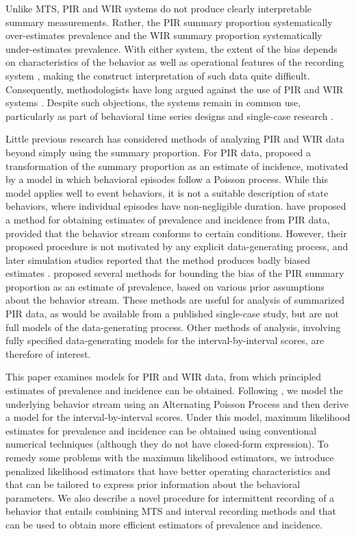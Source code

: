\documentclass[man, noextraspace, floatsintext]{apa6}\usepackage[]{graphicx}\usepackage[]{color}
\begin{document}
Unlike MTS, PIR and WIR systems do not produce clearly interpretable summary measurements. 
Rather, the PIR summary proportion systematically over-estimates prevalence and the WIR summary proportion systematically under-estimates prevalence. 
With either system, the extent of the bias depends on characteristics of the behavior as well as operational features of the recording system \citep{Kraemer1979one, Rogosa1991statistical}, making the construct interpretation of such data quite difficult. 
Consequently, methodologists have long argued against the use of PIR and WIR systems \citep{Altmann1974observational, Mann1991time, Lane2014using}.
Despite such objections, the systems remain in common use, particularly as part of behavioral time series designs and single-case research \citep{Rapp2007interval, Mudford2009continuous, Lane2014using}. 

Little previous research has considered methods of analyzing PIR and WIR data beyond simply using the summary proportion.
For PIR data, \citet{Altmann1970estimating} proposed a transformation of the summary proportion as an estimate of incidence, motivated by a model in which behavioral episodes follow a Poisson process. While this model applies well to event behaviors, it is not a suitable description of state behaviors, where individual episodes have non-negligible duration. 
\citet{Suen1986post, Suen1989analyzing} have proposed a method for obtaining estimates of prevalence and incidence from PIR data, provided that the behavior stream conforms to certain conditions. 
However, their proposed procedure is not motivated by any explicit data-generating process, and later simulation studies reported that the method produces badly biased estimates \citep[sec. 5.2]{Rogosa1991statistical}. 
\citet{Pustejovsky2014four} proposed several methods for bounding the bias of the PIR summary proportion as an estimate of prevalence, based on various prior assumptions about the behavior stream. 
These methods are useful for analysis of summarized PIR data, as would be available from a published single-case study, but are not full models of the data-generating process.
Other methods of analysis, involving fully specified data-generating models for the interval-by-interval scores, are therefore of interest.

This paper examines models for PIR and WIR data, from which principled estimates of prevalence and incidence can be obtained. 
Following \citet{Brown1977estimation}, we model the underlying behavior stream using an Alternating Poisson Process and then derive a model for the interval-by-interval scores. 
Under this model, maximum likelihood estimates for prevalence and incidence can be obtained using conventional numerical techniques (although they do not have closed-form expression). 
To remedy some problems with the maximum likelihood estimators, we introduce penalized likelihood estimators that have better operating characteristics and that can be tailored to express prior information about the behavioral parameters.
We also describe a novel procedure for intermittent recording of a behavior that entails combining MTS and interval recording methods and that can be used to obtain more efficient estimators of prevalence and incidence.
\end{document}
